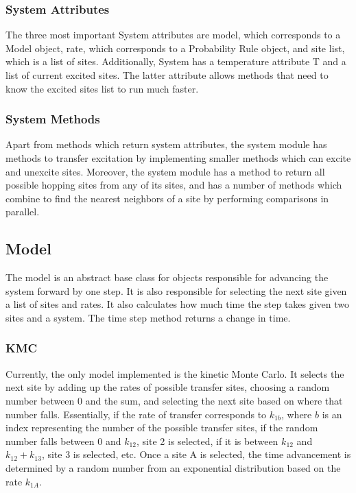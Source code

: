 \documentclass{article}
\begin{document}
\subsubsection{System Attributes}

The three most important System attributes are model, which corresponds to a Model object, rate, which corresponds to a Probability Rule object, and site list, which is a list of sites. Additionally, System has a temperature attribute T and a list of current excited sites. The latter attribute allows methods that need to know the excited sites list to run much faster.

\subsubsection{System Methods}
Apart from methods which return system attributes, the system module has methods to transfer excitation by implementing smaller methods which can excite and unexcite sites. Moreover, the system module has a method to return all possible hopping sites from any of its sites, and has a number of methods which combine to find the nearest neighbors of a site by performing comparisons in parallel.


\subsection{Model}

The model is an abstract base class for objects responsible for advancing the system forward by one step. It is also responsible for selecting the next site given a list of sites and rates. It also calculates how much time the step takes given two sites and a system. The time step method returns a change in time.

\subsubsection{KMC}

Currently, the only model implemented is the kinetic Monte Carlo. It selects the next site by adding up the rates of possible transfer sites, choosing a random number between 0 and the sum, and selecting the next site based on where that number falls. Essentially, if the rate of transfer corresponds to $k_{1b}$, where $b$ is an index representing the number of the possible transfer sites, if the random number falls between 0 and $k_{12}$, site 2 is selected, if it is between $k_{12}$ and $k_{12}+k_{13}$, site 3 is selected, etc. Once a site A is selected, the time advancement is determined by a random number from an exponential distribution based on the rate $k_{1A}$.
\end{document}

